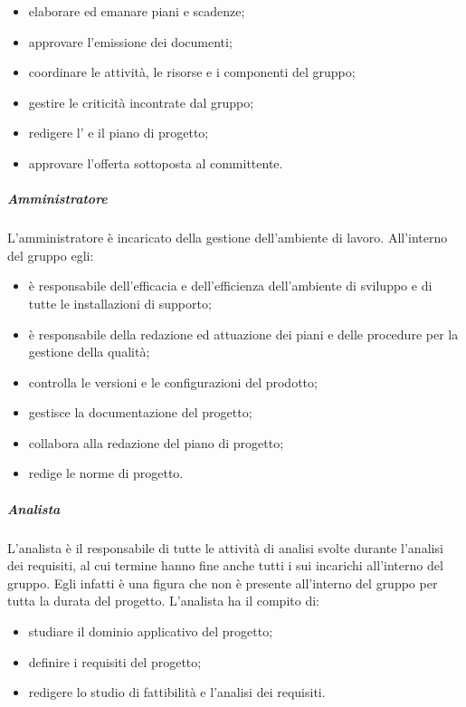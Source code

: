 			\begin{itemize}
				\item elaborare ed emanare piani e scadenze;
				\item approvare l'emissione dei documenti;
				\item coordinare le attività, le risorse e i componenti del gruppo;
				\item gestire le criticità incontrate dal gruppo;
				\item redigere l' e il piano di progetto;
				\item approvare l'offerta sottoposta al committente.
			\end{itemize}

		\subparagraph{Amministratore}

			L'amministratore è incaricato della gestione dell'ambiente di lavoro.
			\newline
			All'interno del gruppo egli:

			\begin{itemize}
				\item è responsabile dell'efficacia e dell'efficienza dell'ambiente di sviluppo e di tutte le installazioni di supporto;
				\item è responsabile della redazione ed attuazione dei piani e delle procedure per la gestione della qualità;
				\item controlla le versioni e le configurazioni del prodotto;
				\item gestisce la documentazione del progetto;
				\item collabora alla redazione del piano di progetto;
				\item redige le norme di progetto.
			\end{itemize}

		\subparagraph{Analista}
			L'analista è il responsabile di tutte le attività di analisi svolte durante l'analisi dei requisiti, al cui termine hanno fine anche tutti i sui incarichi all'interno del gruppo. Egli infatti è una figura che non è presente all'interno del gruppo per tutta la durata del progetto.
			\newline
			L'analista ha il compito di:

			\begin{itemize}
				\item studiare il dominio applicativo del progetto;
				\item definire i requisiti del progetto;
				\item redigere lo studio di fattibilità e l'analisi dei requisiti.
			\end{itemize}

